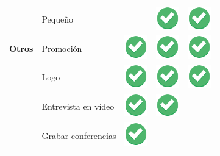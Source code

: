 \documentclass[12pt]{article}
\begin{document}
\begin{table}[ht]
\begin{tabular}{>{\centering\arraybackslash}m{3cm} >{\centering\arraybackslash}m{4cm} >{\centering\arraybackslash}m{2cm} >{\centering\arraybackslash}m{2cm} >{\centering\arraybackslash}m{2cm} }
                    & Pequeño       & &\includegraphics[height=1cm]{Tick Verde.png} &\includegraphics[height=1cm]{Tick Verde.png}\\
        \textbf{Otros}      &Promoción      &\includegraphics[height=1cm]{Tick Verde.png} &\includegraphics[height=1cm]{Tick Verde.png} &\includegraphics[height=1cm]{Tick Verde.png}\\
                    & Logo &\includegraphics[height=1cm]{Tick Verde.png} &\includegraphics[height=1cm]{Tick Verde.png} &\includegraphics[height=1cm]{Tick Verde.png}\\
                    & Entrevista en vídeo   & \includegraphics[height=1cm]{Tick Verde.png}&\includegraphics[height=1cm]{Tick Verde.png} &\\
                    & Grabar conferencias   & \includegraphics[height=1cm]{Tick Verde.png}& &\\

\end{tabular}
\end{table}
\end{document}
